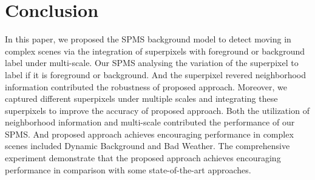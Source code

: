 \documentclass[runningheads,a4paper]{llncs}
\begin{document}
\section{Conclusion}
In this paper, we proposed the SPMS background model to detect moving in
complex scenes via the integration of superpixels with foreground or background
label under multi-scale.
Our SPMS analysing the variation of the superpixel to label if it is foreground or
background. And the superpixel revered neighborhood information contributed
the robustness of proposed approach.
Moreover, we captured different superpixels under multiple scales and
integrating these superpixels to improve the accuracy of proposed approach.
Both the utilization of neighborhood information and multi-scale contributed
the performance of our SPMS.
And proposed approach achieves encouraging performance in complex
scenes included Dynamic Background and Bad Weather.
The comprehensive experiment demonstrate that the proposed approach achieves
encouraging performance in comparison with some state-of-the-art approaches.
\end{document}

